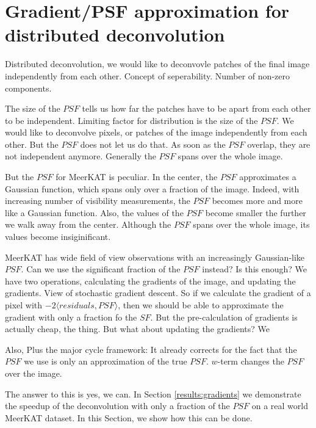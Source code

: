 \section{Gradient/PSF approximation for distributed deconvolution} \label{gradients}

Distributed deconvolution, we would like to deconvovle patches of the final image independently from each other. 
Concept of seperability. Number of non-zero components.

The size of the $PSF$ tells us how far the patches have to be apart from each other to be independent.
Limiting factor for distribution is the size of the $PSF$. We would like to deconvolve pixels, or patches of the image independently from each other. But the $PSF$ does not let us do that. As soon as the $PSF$ overlap, they are not independent anymore.
Generally the $PSF$ spans over the whole image. 

But the $PSF$ for MeerKAT is peculiar.
In the center, the $PSF$ approximates a Gaussian function, which spans only over a fraction of the image. Indeed, with increasing number of visibility measurements, the $PSF$ becomes more and more like a Gaussian function.
Also, the values of the $PSF$ become smaller the further we walk away from the center. Although the $PSF$ spans over the whole image, its values become insiginificant.

MeerKAT has wide field of view observations with an increasingly Gaussian-like $PSF$. Can we use the significant fraction of the $PSF$ instead? Is this enough?
We have two operations, calculating the gradients of the image, and updating the gradients.
View of stochastic gradient descent. So if we calculate the gradient of a pixel with $-2 \langle residuals, PSF \rangle$, then we should be able to approximate the gradient with only a fraction fo the $SF$. But the pre-calculation of gradients is actually cheap, the thing. But what about updating the gradients?
We


Also,
Plus the major cycle framework: It already corrects for the fact that the $PSF$ we use is only an approximation of the true $PSF$. $w$-term changes the $PSF$ over the image. 



The answer to this is yes, we can. In Section \ref{results:gradients} we demonstrate the speedup of the deconvolution with only a fraction of the $PSF$ on a real world MeerKAT dataset. In this Section, we show how this can be done. 



